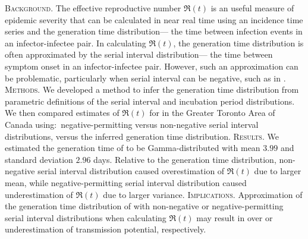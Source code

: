 \textsc{Background}.
The effective reproductive number $\Re(t)$
is an useful measure of epidemic severity
that can be calculated in near real time
using an incidence time series and the generation time distribution---%
the time between infection events in an infector-infectee pair.
In calculating $\Re(t)$, the generation time distribution
is often approximated by the serial interval distribution---%
the time between symptom onset in an infector-infectee pair.
However, such an approximation can be problematic,
particularly when serial interval can be negative, such as in \covid.
\textsc{Methods}.
We developed a method to infer the generation time distribution
from parametric definitions of
the serial interval and incubation period distributions.
We then compared estimates of $\Re(t)$ for \covid in
the Greater Toronto Area of Canada using:\
negative-permitting versus non-negative serial interval distributions,
versus the inferred generation time distribution.
\textsc{Results}.
We estimated the generation time of \covid to be
Gamma-distributed with mean $3.99$ and standard deviation $2.96$ days.
Relative to the generation time distribution,
non-negative serial interval distribution caused overestimation of $\Re(t)$
due to larger mean, while
negative-permitting serial interval distribution caused underestimation of $\Re(t)$
due to larger variance.
\textsc{Implications}.
Approximation of the generation time distribution of \covid
with non-negative or negative-permitting serial interval distributions
when calculating $\Re(t)$ may result in over or underestimation of
transmission potential, respectively.
